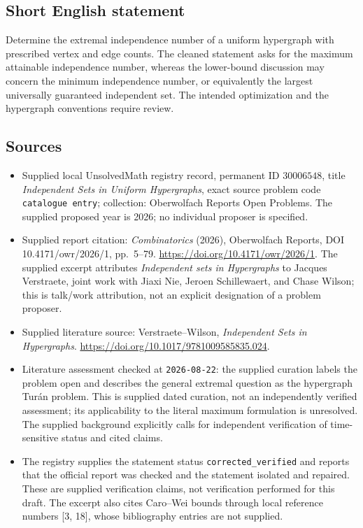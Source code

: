 \documentclass[11pt]{article}
\begin{document}
\subsection{Short English statement}
Determine the extremal independence number of a uniform hypergraph with prescribed vertex and edge counts. The cleaned statement asks for the maximum attainable independence number, whereas the lower-bound discussion may concern the minimum independence number, or equivalently the largest universally guaranteed independent set. The intended optimization and the hypergraph conventions require review.
\subsection{Sources}
\begin{itemize}
\item Supplied local UnsolvedMath registry record, permanent ID \(30006548\), title \emph{Independent Sets in Uniform Hypergraphs}, exact source problem code \texttt{catalogue entry}; collection: Oberwolfach Reports Open Problems. The supplied proposed year is 2026; no individual proposer is specified.
\item Supplied report citation: \emph{Combinatorics} (2026), Oberwolfach Reports, DOI 10.4171/owr/2026/1, pp.\ 5--79. \url{https://doi.org/10.4171/owr/2026/1}. The supplied excerpt attributes \emph{Independent sets in Hypergraphs} to Jacques Verstraete, joint work with Jiaxi Nie, Jeroen Schillewaert, and Chase Wilson; this is talk/work attribution, not an explicit designation of a problem proposer.
\item Supplied literature source: Verstraete--Wilson, \emph{Independent Sets in Hypergraphs}. \url{https://doi.org/10.1017/9781009585835.024}.
\item Literature assessment checked at \texttt{2026-08-22}: the supplied curation labels the problem open and describes the general extremal question as the hypergraph Tur\'an problem. This is supplied dated curation, not an independently verified assessment; its applicability to the literal maximum formulation is unresolved. The supplied background explicitly calls for independent verification of time-sensitive status and cited claims.
\item The registry supplies the statement status \texttt{corrected\_verified} and reports that the official report was checked and the statement isolated and repaired. These are supplied verification claims, not verification performed for this draft. The excerpt also cites Caro--Wei bounds through local reference numbers [3, 18], whose bibliography entries are not supplied.
\end{itemize}
\end{document}

